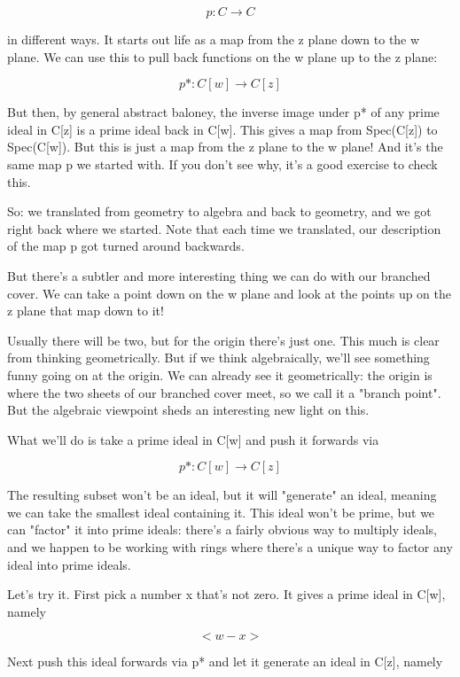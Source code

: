 $$

p: C \to  C
$$
    

in different ways.  It starts out life as a map from the z plane down 
to the w plane.   We can use this to pull back functions on the w 
plane up to the z plane:

$$
p*: C[w] \to  C[z]
$$
    

But then, by general abstract baloney, the inverse image under p* of 
any prime ideal in C[z] is a prime ideal back in C[w].  This gives a 
map from Spec(C[z]) to Spec(C[w]).  But this is just a map from the z 
plane to the w plane!  And it's the same map p we started with.  If you
don't see why, it's a good exercise to check this.

So: we translated from geometry to algebra and back to geometry, and 
we got right back where we started.   Note that each time we translated,
our description of the map p got turned around backwards.

But there's a subtler and more interesting thing we can do with our
branched cover.  We can take a point down on the w plane and look at 
the points up on the z plane that map down to it!  

Usually there will be two, but for the origin there's just one.  This 
much is clear from thinking geometrically.  But if we think algebraically, 
we'll see something funny going on at the origin.   We can already see 
it geometrically: the origin is where the two sheets of our branched 
cover meet, so we call it a "branch point".  But the algebraic 
viewpoint sheds an interesting new light on this.  

What we'll do is take a prime ideal in C[w] and push it forwards via


$$

p*: C[w] \to  C[z]
$$
    
The resulting subset won't be an ideal, but it will "generate" an 
ideal, meaning we can take the smallest ideal containing it.  This
ideal won't be prime, but we can "factor" it into prime 
ideals: there's
a fairly obvious way to multiply ideals, and we happen to be working
with rings where there's a unique way to factor any ideal into prime
ideals.

Let's try it.  First pick a number x that's not zero.  It gives a prime 
ideal in C[w], namely 


$$

<w - x>
$$
    
Next push this ideal forwards via p* and let it generate an
ideal in C[z], namely


